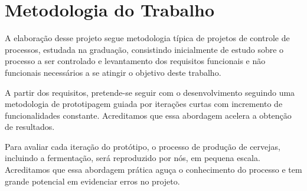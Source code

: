 \chapter{Metodologia do Trabalho}

A elaboração desse projeto segue metodologia típica de projetos de controle de
processos, estudada na graduação, consistindo inicialmente de estudo sobre o
processo a ser controlado e levantamento dos requisitos funcionais e não funcionais
necessários a se atingir o objetivo deste trabalho.


A partir dos requisitos, pretende-se seguir com o desenvolvimento seguindo uma
metodologia de prototipagem guiada por iterações curtas com incremento de
funcionalidades constante. Acreditamos que essa abordagem acelera a obtenção de
resultados.


Para avaliar cada iteração do protótipo, o processo de produção de cervejas,
incluindo a fermentação, será reproduzido por nós, em pequena escala. Acreditamos
que essa abordagem prática aguça o conhecimento do processo e tem grande
potencial em evidenciar erros no projeto.